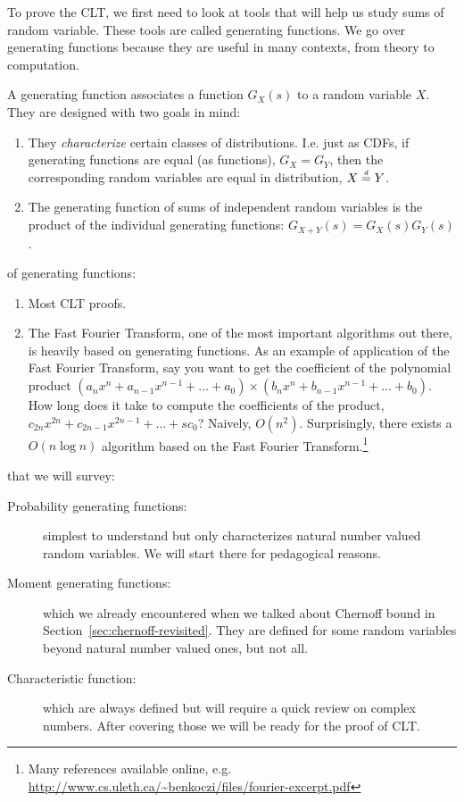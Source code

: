 \documentclass{article}
\begin{document}
To prove the CLT, we first need to look at tools that will help us study sums of random variable. These tools are called generating functions.  We go over generating functions because they are useful in many contexts, from theory to computation. 

 A generating function associates a function $G_X(s)$ to a random variable $X$. They are designed with two goals in mind:
\begin{enumerate}
	\item They \emph{characterize} certain classes of distributions. I.e. just as CDFs, if generating functions are equal (as functions), $G_X = G_Y$, then the corresponding random variables are equal in distribution, $X \stackrel{\scriptscriptstyle d}{=} Y$.
	\item The generating function of sums of independent random variables is the product of the individual generating functions: $G_{X+Y}(s) = G_X(s) G_Y(s)$. 
\end{enumerate}

 of generating functions:
\begin{enumerate}
	\item Most CLT proofs.
	\item The Fast Fourier Transform, one of the most important algorithms out there, is heavily based on generating functions. As an example of application of the Fast Fourier Transform, say you want to get the coefficient of the polynomial product $(a_n x^n + a_{n-1} x^{n-1} + \dots + a_0) \times (b_n x^n + b_{n-1} x^{n-1} + \dots + b_0)$. How long does it take to compute the coefficients of the product, $c_{2n} x^{2n} + c_{2n-1} x^{2n-1} + \dots +s c_0$? Naively, $O(n^2)$. Surprisingly, there exists a $O(n \log n)$ algorithm based on the Fast Fourier Transform.\footnote{Many references available online, e.g. \url{http://www.cs.uleth.ca/~benkoczi/files/fourier-excerpt.pdf}}
\end{enumerate}

 that we will survey:
\begin{description}
	\item[Probability generating functions:] simplest to understand but only characterizes natural number valued random variables. We will start there for pedagogical reasons.
	\item[Moment generating functions:] which we already encountered when we talked about Chernoff bound in Section~\ref{sec:chernoff-revisited}. They are defined for some random variables beyond natural number valued ones, but not all.
	\item[Characteristic function:] which are always defined but will require a quick review on complex numbers. After covering those we will be ready for the proof of CLT.
\end{description}
\end{document}
